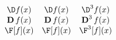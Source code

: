 \documentclass{unittest}
\begin{document}
\(\begin{array}{ccccc}
\\\\%
	\D f(x)  & \D f(x)  & \D^3 f(x)
\\	\operatorname{\mathbf{D}}f(x) & \operatorname{\mathbf{D}}f(x)  & \operatorname{\mathbf{D}}^3 f(x)
\\ \F[f](x)  & \F[f](x)  & \F^3[f](x)
\\\\%
\end{array}\)
\end{document}
